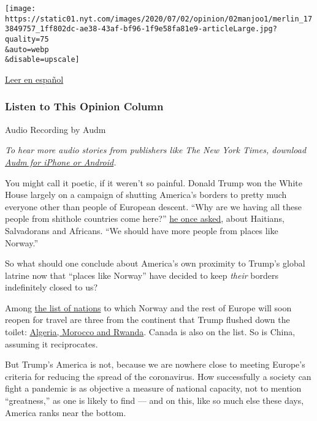 \texttt{[image: https://static01.nyt.com/images/2020/07/02/opinion/02manjoo1/merlin\_173849757\_1ff802dc-ae38-43af-bf96-1f9e58fa81e9-articleLarge.jpg?quality=75\\\&auto=webp\\\&disable=upscale]}

\href{https://www.nytimes.com/es/2020/07/03/espanol/opinion/prohibicion-viajar-europa.html}{Leer
en español}

\hypertarget{listen-to-this-opinion-column}{%
\subsubsection{Listen to This Opinion
Column}\label{listen-to-this-opinion-column}}

Audio Recording by Audm

\emph{To hear more audio stories from publishers like The New York
Times, download}
\href{https://www.audm.com/?utm_source=nytopinion\&utm_medium=embed\&utm_campaign=world_america_out}{\emph{Audm
for iPhone or Android}}\emph{.}

You might call it poetic, if it weren't so painful. Donald Trump won the
White House largely on a campaign of shutting America's borders to
pretty much everyone other than people of European descent. ``Why are we
having all these people from shithole countries come here?''
\href{https://www.washingtonpost.com/politics/trump-attacks-protections-for-immigrants-from-shithole-countries-in-oval-office-meeting/2018/01/11/bfc0725c-f711-11e7-91af-31ac729add94_story.html}{he
once asked}, about Haitians, Salvadorans and Africans. ``We should have
more people from places like Norway.''

So what should one conclude about America's own proximity to Trump's
global latrine now that ``places like Norway'' have decided to keep
\emph{their} borders indefinitely closed to us?

Among
\href{https://www.consilium.europa.eu/en/press/press-releases/2020/06/30/council-agrees-to-start-lifting-travel-restrictions-for-residents-of-some-third-countries/}{the
list of nations} to which Norway and the rest of Europe will soon reopen
for travel are three from the continent that Trump flushed down the
toilet:
\href{https://www.nytimes.com/2020/06/30/world/europe/eu-reopening-blocks-us-travelers.html}{Algeria,
Morocco and Rwanda}. Canada is also on the list. So is China, assuming
it reciprocates.

But Trump's America is not, because we are nowhere close to meeting
Europe's criteria for reducing the spread of the coronavirus. How
successfully a society can fight a pandemic is as objective a measure of
national capacity, not to mention ``greatness,'' as one is likely to
find --- and on this, like so much else these days, America ranks near
the bottom.

